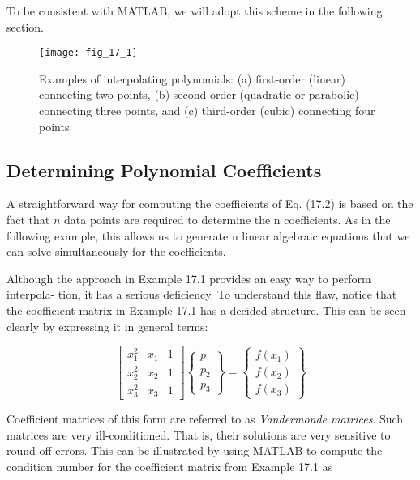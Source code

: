 \documentclass[../main.tex]{subfiles}
\begin{document}
\noindent To be consistent with MATLAB, we will adopt this scheme in the following section.

\begin{figure}[H] 
	\centering
	\texttt{[image: fig\_17\_1]}
	\caption{\textsf{Examples of interpolating polynomials: (a) first-order (linear) connecting two points,
	(b) second-order (quadratic or parabolic) connecting three points, and (c) third-order (cubic)
	connecting four points.}}
	\label{fig:fig_17_1}
\end{figure}

\label{cha:cha_P_17_1_1}
\subsection{Determining Polynomial Coefficients}

\noindent A straightforward way for computing the coefficients of Eq. (17.2) is based on the fact that
$n$ data points are required to determine the n coefficients. As in the following example, this
allows us to generate n linear algebraic equations that we can solve simultaneously for the
coefficients.


Although the approach in Example 17.1 provides an easy way to perform interpola-
tion, it has a serious deficiency. To understand this flaw, notice that the coefficient matrix
in Example 17.1 has a decided structure. This can be seen clearly by expressing it in general terms:

\begin{equation}
	\tag{17.3}
	\begin{bmatrix}
		x ^ 2 _ 1 & x_1 & 1 \\
		x ^ 2 _ 2 & x_2 & 1 \\
		x ^ 2 _ 3 & x_3 & 1
	\end{bmatrix}
	\begin{Bmatrix}
		p_1 \\ p_2 \\ p_3
	\end{Bmatrix}
	=
	\begin{Bmatrix}
		f(x_1) \\
		f(x_2) \\
		f(x_3)
	\end{Bmatrix}
\end{equation}

Coefficient matrices of this form are referred to as \textit{Vandermonde matrices}. Such matrices are very ill-conditioned. That is, their solutions are very sensitive to round-off errors.
This can be illustrated by using MATLAB to compute the condition number for the coefficient matrix from Example 17.1 as
\end{document}

